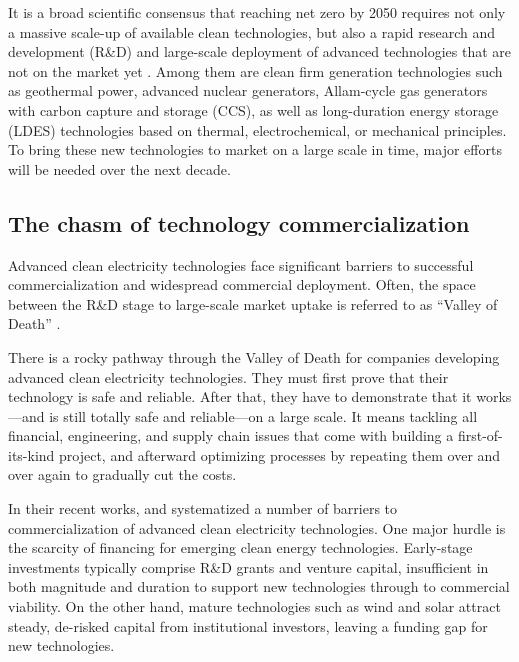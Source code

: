 \documentclass[pdflatex,sn-basic, Numbered]{sn-jnl}%
\theoremstyle{thmstyleone}%
\theoremstyle{thmstyletwo}%
\theoremstyle{thmstylethree}%
\begin{document}
It is a broad scientific consensus that reaching net zero by 2050 requires not only a massive scale-up of available clean technologies, but also a rapid research and development (R\&D) and large-scale deployment of advanced technologies that are not on the market yet \cite{sepulvedaRoleFirmLowCarbon2018, bistlineImpactCarbonDioxide2021, brownUltralongdurationEnergyStorage2023, ieaNetZero20502021}.
Among them are clean firm generation technologies such as geothermal power, advanced nuclear generators, Allam-cycle gas generators with carbon capture and storage (CCS), as well as long-duration energy storage (LDES) technologies based on thermal, electrochemical, or mechanical principles.
To bring these new technologies to market on a large scale in time, major efforts will be needed over the next decade.


\subsection*{The chasm of technology commercialization}\label{sec2}

Advanced clean electricity technologies face significant barriers to successful commercialization and widespread commercial deployment.
Often, the space between the R\&D stage to large-scale market uptake is referred to as  \enquote{Valley of Death} \cite{gatesFinancingCleanIndustrial2021, google-advancedtech}.

There is a rocky pathway through the Valley of Death for companies developing advanced clean electricity technologies.
They must first prove that their technology is safe and reliable.
After that, they have to demonstrate that it works---and is still totally safe and reliable---on a large scale.
It means tackling all financial, engineering, and supply chain issues that come with building a first-of-its-kind project, and afterward optimizing processes by repeating them over and over again to gradually cut the costs.

In their recent works, \citet{google-advancedtech} and \citet{khatcherianBarriersTimelyDeployment2022} systematized a number of barriers to commercialization of advanced clean electricity technologies. One major hurdle is the scarcity of financing for emerging clean energy technologies. Early-stage investments typically comprise R\&D grants and venture capital, insufficient in both magnitude and duration to support new technologies through to commercial viability. On the other hand, mature technologies such as wind and solar attract steady, de-risked capital from institutional investors, leaving a funding gap for new technologies.
\end{document}

